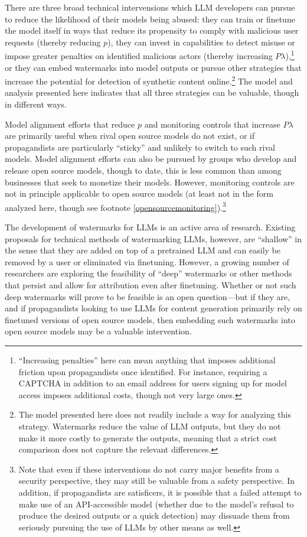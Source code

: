 \documentclass{article}
\begin{document}
There are three broad technical intervensions which LLM developers can pursue to reduce the likelihood of their models being abused: they can train or finetune the model itself in ways that reduce its propensity to comply with malicious user requests (thereby reducing $p$), they can invest in capabilities to detect misuse or impose greater penalties on identified malicious actors (thereby increasing $P\lambda$),\footnote{``Increasing penalties'' here can mean anything that imposes additional friction upon propagandists once identified. For instance, requiring a CAPTCHA in addition to an email address for users signing up for model access imposes additional costs, though not very large ones.} or they can embed watermarks into model outputs or pursue other strategies that increase the potential for detection of synthetic content online.\footnote{The model presented here does not readily include a way for analyzing this strategy. Watermarks reduce the value of LLM outputs, but they do not make it more costly to generate the outputs, meaning that a strict cost comparison does not capture the relevant differences.} The model and analysis presented here indicates that all three strategies can be valuable, though in different ways.

Model alignment efforts that reduce $p$ and monitoring controls that increase $P\lambda$ are primarily useful when rival open source models do not exist, or if propagandists are particularly ``sticky'' and unlikely to switch to such rival models. Model alignment efforts can also be pursued by groups who develop and release open source models, though to date, this is less common than among businesses that seek to monetize their models. However, monitoring controls are not in principle applicable to open source models (at least not in the form analyzed here, though see footnote \ref{opensourcemonitoring}).\footnote{Note that even if these interventions do not carry major benefits from a security perspective, they may still be valuable from a safety perspective. In addition, if propagandists are satisficers, it is possible that a failed attempt to make use of an API-accessible model (whether due to the model's refusal to produce the desired outputs or a quick detection) may dissuade them from seriously pursuing the use of LLMs by other means as well.}

The development of watermarks for LLMs is an active area of research. Existing proposals for technical methods of watermarking LLMs, however, are ``shallow'' in the sense that they are added on top of a pretrained LLM and can easily be removed by a user or eliminated via finetuning. \cite{watermark} However, a growing number of researchers are exploring the feasibility of ``deep'' watermarks or other methods that persist and allow for attribution even after finetuning. \cite{deepwatermark, attribution, competition} Whether or not such deep watermarks will prove to be feasible is an open question—but if they are, and if propagandists looking to use LLMs for content generation primarily rely on finetuned versions of open source models, then embedding such watermarks into open source models may be a valuable intervention. 
\end{document}

